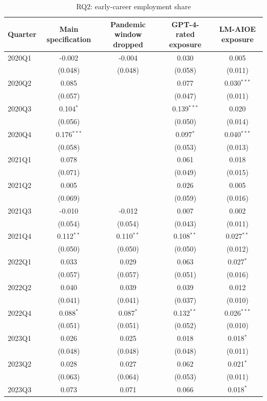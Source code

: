 \begin{table}[htbp]\centering
\caption{RQ2: early-career employment share}
\begin{tabular}{lcccc}
\toprule
Quarter & Main specification & Pandemic window dropped & GPT-4-rated exposure & LM-AIOE exposure \\
\midrule
2020Q1 & -0.002 & -0.004 & 0.030 & 0.005 \\
 & (0.048) & (0.048) & (0.058) & (0.011) \\
2020Q2 & 0.085 &  & 0.077 & 0.030$^{***}$ \\
 & (0.057) &  & (0.047) & (0.011) \\
2020Q3 & 0.104$^{*}$ &  & 0.139$^{***}$ & 0.020 \\
 & (0.056) &  & (0.050) & (0.014) \\
2020Q4 & 0.176$^{***}$ &  & 0.097$^{*}$ & 0.040$^{***}$ \\
 & (0.058) &  & (0.053) & (0.013) \\
2021Q1 & 0.078 &  & 0.061 & 0.018 \\
 & (0.071) &  & (0.049) & (0.015) \\
2021Q2 & 0.005 &  & 0.026 & 0.005 \\
 & (0.069) &  & (0.059) & (0.016) \\
2021Q3 & -0.010 & -0.012 & 0.007 & 0.002 \\
 & (0.054) & (0.054) & (0.043) & (0.011) \\
2021Q4 & 0.112$^{**}$ & 0.110$^{**}$ & 0.108$^{**}$ & 0.027$^{**}$ \\
 & (0.050) & (0.050) & (0.050) & (0.012) \\
2022Q1 & 0.033 & 0.029 & 0.063 & 0.027$^{*}$ \\
 & (0.057) & (0.057) & (0.051) & (0.016) \\
2022Q2 & 0.040 & 0.039 & 0.039 & 0.012 \\
 & (0.041) & (0.041) & (0.037) & (0.010) \\
2022Q4 & 0.088$^{*}$ & 0.087$^{*}$ & 0.132$^{**}$ & 0.026$^{***}$ \\
 & (0.051) & (0.051) & (0.052) & (0.010) \\
2023Q1 & 0.026 & 0.025 & 0.018 & 0.018$^{*}$ \\
 & (0.048) & (0.048) & (0.048) & (0.011) \\
2023Q2 & 0.028 & 0.027 & 0.062 & 0.021$^{*}$ \\
 & (0.063) & (0.064) & (0.053) & (0.011) \\
2023Q3 & 0.073 & 0.071 & 0.066 & 0.018$^{*}$ \\

\end{tabular}
\end{table}
